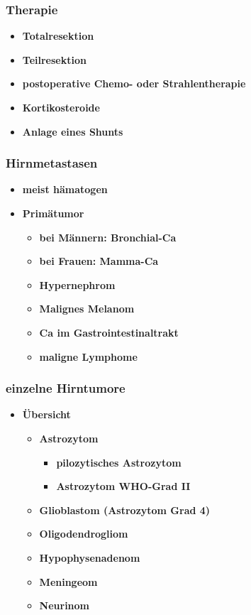 	\subsubsection{Therapie}
		\begin{itemize}
			\item \textbf{Totalresektion}
			\item \textbf{Teilresektion}
			\item \textbf{postoperative Chemo- oder Strahlentherapie}
			\item \textbf{Kortikosteroide}
			\item \textbf{Anlage eines Shunts}
		\end{itemize}
	\subsubsection{Hirnmetastasen}
		\begin{itemize}
			\item \textbf{meist hämatogen}
			\item \textbf{Primätumor}
				\begin{itemize}
					\item \textbf{bei Männern: Bronchial-Ca}
					\item \textbf{bei Frauen: Mamma-Ca}
					\item \textbf{Hypernephrom}
					\item \textbf{Malignes Melanom}
					\item \textbf{Ca im Gastrointestinaltrakt}
					\item \textbf{maligne Lymphome}
				\end{itemize}
		\end{itemize}
	\subsubsection{einzelne Hirntumore}
		\begin{itemize}
			\item \textbf{Übersicht}
				\begin{itemize}
					\item \textbf{Astrozytom}
						\begin{itemize}
							\item \textbf{pilozytisches Astrozytom}
							\item \textbf{Astrozytom WHO-Grad II}
						\end{itemize}					
					\item \textbf{Glioblastom (Astrozytom Grad 4)}
					\item \textbf{Oligodendrogliom}
					\item \textbf{Hypophysenadenom}
					\item \textbf{Meningeom}
					\item \textbf{Neurinom}
				\end{itemize}
		\end{itemize}
			
